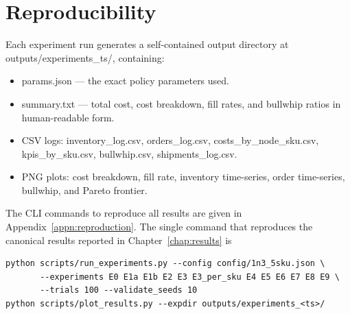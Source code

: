 \section{Reproducibility}
\label{sec:meth:reproducibility}

Each experiment run generates a self-contained output directory at
outputs/experiments\_\textlangle ts\textrangle /, containing:

\begin{itemize}
  \item params.json — the exact policy parameters used.
  \item summary.txt — total cost, cost breakdown, fill rates,
        and bullwhip ratios in human-readable form.
  \item CSV logs: inventory\_log.csv, orders\_log.csv,
        costs\_by\_node\_sku.csv, kpis\_by\_sku.csv,
        bullwhip.csv, shipments\_log.csv.
  \item PNG plots: cost breakdown, fill rate, inventory time-series,
        order time-series, bullwhip, and Pareto frontier.
\end{itemize}

The CLI commands to reproduce all results are given in
Appendix~\ref{appn:reproduction}.  The single command that reproduces
the canonical results reported in Chapter~\ref{chap:results} is

\begin{verbatim}
python scripts/run_experiments.py --config config/1n3_5sku.json \
       --experiments E0 E1a E1b E2 E3 E3_per_sku E4 E5 E6 E7 E8 E9 \
       --trials 100 --validate_seeds 10
python scripts/plot_results.py --expdir outputs/experiments_<ts>/
\end{verbatim}
